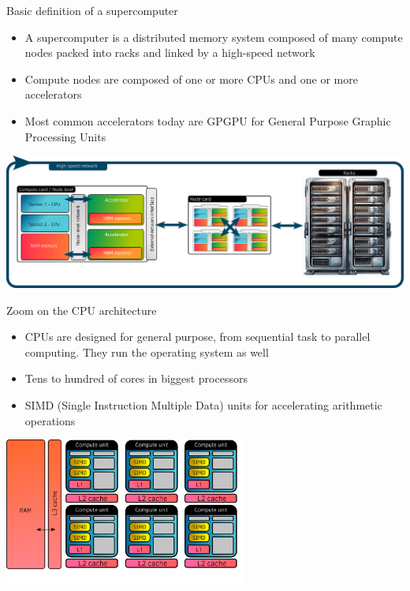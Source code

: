\documentclass[aspectratio=169]{beamer}
\begin{document}
\begin{frame}{Basic definition of a supercomputer}
    \begin{itemize}
        \item A supercomputer is a distributed memory system composed of many compute nodes packed into racks and linked by a high-speed network
        \item Compute nodes are composed of one or more CPUs and one or more accelerators
        \item Most common accelerators today are GPGPU for General Purpose Graphic Processing Units
    \end{itemize}
    \begin{center}
        \includegraphics[width=\textwidth]{super-computer_architecture.png}
    \end{center}
\end{frame}


\begin{frame}{Zoom on the CPU architecture}
    \begin{itemize}
        \item CPUs are designed for general purpose, from sequential task to parallel computing. They run the operating system as well
        \item Tens to hundred of cores in biggest processors
        \item SIMD (Single Instruction Multiple Data) units for accelerating arithmetic operations
    \end{itemize}
    \begin{center}
        \includegraphics[width=0.6\textwidth]{cpu_architecture.png}
    \end{center}
\end{frame}
\end{document}
